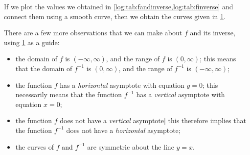 \begin{pccexample}[Graphing]
\begin{pccsolution}
		If we plot the values we obtained in \cref{log:tab:fandinverse,log:tab:finverse} 
		and connect them using a smooth curve, then we obtain the curves given in \cref{log:fig:fandinverse}.
		\begin{figure}[!htb]
			\centering
			\caption{}
			\label{log:fig:fandinverse}
		\end{figure}
		
		There are a few more observations that we can make about $f$ and its inverse, using \cref{log:fig:fandinverse} 
		as a guide:
		\begin{itemize}
			\item the domain of $f$ is $(-\infty,\infty)$, and the range of $f$ is $(0,\infty)$; this means
			that the domain of $f^{-1}$ is $(0,\infty)$, and the range of $f^{-1}$ is $(-\infty,\infty)$;
			\item the function $f$ has a \emph{horizontal} asymptote with equation $y=0$; this necessarily
			means that the function $f^{-1}$ has a \emph{vertical} asymptote with equation $x=0$;
			\item the function $f$ does not have a \emph{vertical} asymptote| this therefore
			implies that the function $f^{-1}$ does not have a \emph{horizontal} asymptote;
			\item the curves of $f$ and $f^{-1}$ are symmetric about the line $y=x$.
		\end{itemize}
	\end{pccsolution}
\end{pccexample}



